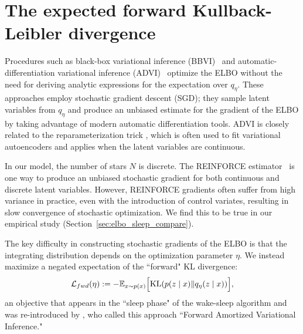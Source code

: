 \section{The expected forward Kullback-Leibler divergence}
\label{sec:wake_sleep}


Procedures such as black-box variational inference (BBVI)~\citep{ranganath2013black} and
automatic-differentiation variational inference (ADVI)~\citep{kucukelbir2016automatic}
optimize the ELBO  without the need for
deriving analytic expressions for the expectation over $q_\eta$.
These approaches employ stochastic gradient descent (SGD);
they sample latent variables from $q_\eta$ and produce an unbiased estimate for the gradient of the ELBO by taking advantage of modern automatic differentiation tools.
ADVI is closely related to the reparameterization trick \citep{SpallOptimization2003,kingma2013autoencoding, rezende2014stochastic}, which is often used to fit variational autoencoders and applies when the latent variables are continuous.

In our model, the number of stars $N$ is discrete.
The REINFORCE estimator~\citep{Williams1992reinforce} is one way to produce an unbiased stochastic gradient for both continuous and discrete latent variables.
However, REINFORCE gradients often suffer from high variance in practice, even with the introduction of control variates, resulting in slow convergence of stochastic optimization. We find this to be true in our empirical study (Section~\ref{sec:elbo_sleep_compare}).

The key difficulty in constructing stochastic gradients of the ELBO is that the
integrating distribution depends on the optimization parameter $\eta$.
We instead maximize a negated expectation of the ``forward" KL divergence:
\begin{align}
    \mathcal{L}_{fwd}(\eta) :=
    - \mathbb{E}_{x \sim p(x)}\Big[\textrm{KL}(p(z \mid x) \| q_\eta(z \mid x))\Big]
    \label{eq:sleep_obj},
\end{align}
an objective that appears in the ``sleep phase" of the wake-sleep algorithm
\citep{Hinton1995wake_sleep, bornschein2014reweighted,le2020revisiting}
and was re-introduced by \cite{ambrogioni2019favi}, who called this approach ``Forward Amortized Variational Inference."

